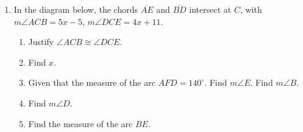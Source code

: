 \documentclass[12pt, twoside]{article}
\begin{document}
\begin{enumerate}
\newpage


  \item In the diagram below, the chords $\overline{AE}$ and $\overline{BD}$ intersect at $C$, with $m \angle ACB = 5x-5$, $m \angle DCE = 4x+11$.
  \begin{enumerate}
    \item Justify $\angle ACB \cong \angle DCE$. \vspace{1cm}
    \item Find $x$.  \vspace{3cm}
    \item Given that the measure of the arc $AFD=140^\circ$. Find $m\angle E$. Find $m\angle B$.  \vspace{1cm}
    \item Find $m\angle D$.  \vspace{3cm}
    \item Find the measure of the arc $BE$.  \vspace{1cm}
  \end{enumerate}
      \begin{center}
    \end{center}

\end{enumerate}
\end{document}
